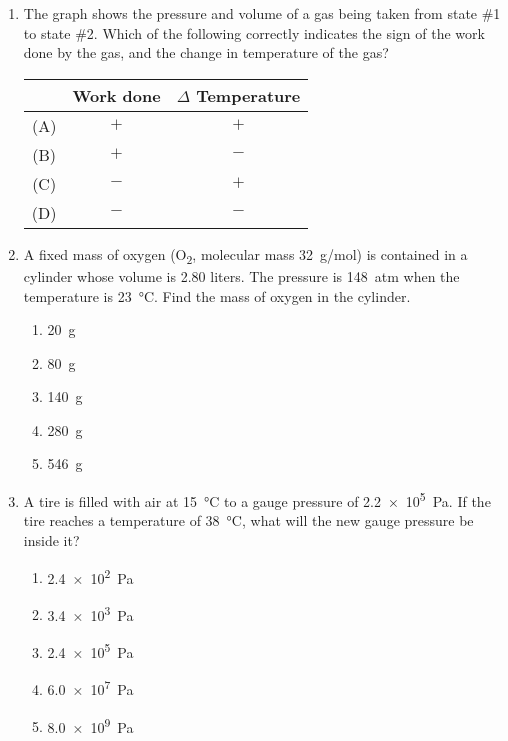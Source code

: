 \documentclass{../../../oss-apphys}
\begin{document}
\begin{multicols}{2}
\begin{enumerate}[leftmargin=18pt,start=24]
  \item The graph shows the pressure and volume of a gas being taken from state
    \#1 to state \#2. Which of the following correctly indicates the sign of
    the work done by the gas, and the change in temperature of the gas?
    \begin{center}
      \vspace{-.15in}

      \begin{tabular}{ccc}
        & \textbf{Work done} & $\Delta$ \textbf{Temperature}\\ \hline
        (A) & $+$ & $+$ \\
        (B) & $+$ & $-$ \\
        (C) & $-$ & $+$ \\
        (D) & $-$ & $-$
      \end{tabular}
    \end{center}

    \columnbreak
    
  \item A fixed mass of oxygen (O\textsubscript{2}, molecular mass
    \SI{32}{g/mol}) is contained in a cylinder whose volume is \num{2.80}
    liters. The pressure is \SI{148}{atm} when the temperature is
    \SI{23}{\celsius}. Find the mass of oxygen in the cylinder.
    \begin{enumerate}[noitemsep,topsep=0pt,leftmargin=18pt,label=(\Alph*)]
    \item\SI{20}{\gram}
    \item\SI{80}{\gram}
    \item\SI{140}{\gram}
    \item\SI{280}{\gram}
    \item\SI{546}{\gram}
    \end{enumerate}

  \item A tire is filled with air at \SI{15}{\celsius} to a gauge pressure of
    \SI{2.2e5}{\pascal}. If the tire reaches a temperature of \SI{38}{\celsius},
    what will the new gauge pressure be inside it?
    \begin{enumerate}[noitemsep,topsep=0pt,leftmargin=18pt,label=(\Alph*)]
    \item\SI{2.4e2}{\pascal}
    \item\SI{3.4e3}{\pascal}
    \item\SI{2.4e5}{\pascal}
    \item\SI{6.0e7}{\pascal}
    \item\SI{8.0e9}{\pascal}
    \end{enumerate}


\end{enumerate}
\end{multicols}
\end{document}
